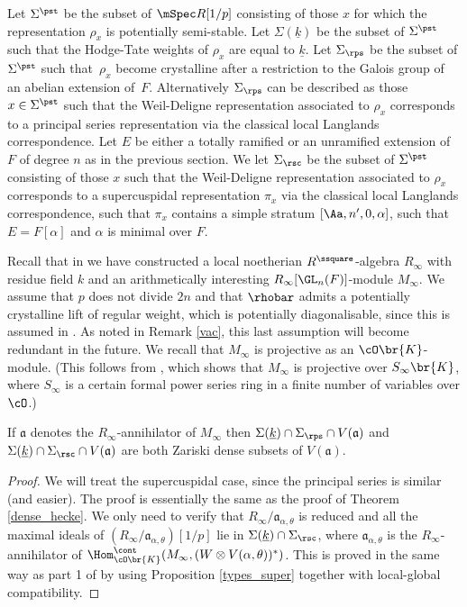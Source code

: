 Let $\Sigma^{\pst}$ be the subset of $\mSpec R[1/p]$ consisting of those
$x$ for which the representation $\rho_x$ is potentially semi-stable. Let $\Sigma(\underline{k})$ be the subset of $\Sigma^{\pst}$
such that the Hodge-Tate weights of $\rho_x$ are equal to $\underline{k}$. Let $\Sigma_{\rps}$ be the subset of $\Sigma^{\pst}$
such that~$\rho_x$ become crystalline after a restriction to the Galois group of an abelian extension of~$F$. Alternatively $\Sigma_{\rps}$ can be described
as those $x\in \Sigma^{\pst}$ such that the Weil-Deligne representation associated to $\rho_x$ corresponds to a principal series representation via the
classical local Langlands correspondence. Let $E$ be either a totally ramified or an unramified extension of $F$ of degree $n$ as in the previous section. We
let $\Sigma_{\rsc}$ be the subset of $\Sigma^{\pst}$ consisting of those $x$ such that the Weil-Deligne representation associated to $\rho_x$ corresponds to
a supercuspidal representation $\pi_x$ via the classical local Langlands correspondence, such that $\pi_x$ contains a simple stratum $[\Aa, n', 0, \alpha]$, such that $E=F[\alpha]$ and $\alpha$ is minimal over $F$.

Recall that in \cite{six-authors} we have constructed a local noetherian $R^\ssquare$-algebra $R_{\infty}$ with residue field $k$ and an arithmetically interesting $R_{\infty}[\GL_n(F)]$-module $M_{\infty}$. We assume that
$p$ does not divide $2n$ and that $\rhobar$ admits a potentially crystalline lift of regular weight, which is
potentially diagonalisable, since this is assumed in \cite{six-authors}. As noted in Remark \ref{vac}, this last assumption will become redundant in the future.
We recall that $M_{\infty}$ is projective as an $\cO\br{K}$-module.
(This follows from \cite[Prop.\,2.10]{six-authors}, which
shows that $M_{\infty}$ is projective over $S_{\infty}\br{K}$,
where $S_{\infty}$ is a certain formal power series ring in a finite
number of variables over $\cO$.)

\begin{thm}\label{capture_local} If $\mathfrak a$ denotes
the $R_{\infty}$-annihilator of $M_{\infty}$
then $\Sigma(\underline{k}) \cap \Sigma_{\rps}\cap V(\mathfrak a)$ and
$\Sigma(\underline{k}) \cap \Sigma_{\rsc}\cap V(\mathfrak a)$ are both Zariski dense
subsets of $V(\mathfrak a)$.
\end{thm}

\begin{proof} We will treat the supercuspidal case, since
the principal series is similar (and easier).
The proof is essentially the same as the proof of Theorem \ref{dense_hecke}. We only need to verify that $R_{\infty}/\mathfrak a_{\alpha, \theta}$ is reduced and all the maximal ideals of $(R_{\infty}/\mathfrak a_{\alpha, \theta})[1/p]$ lie in $\Sigma(\underline{k})\cap \Sigma_{\rsc}$, where
$\mathfrak a_{\alpha, \theta}$ is the $R_{\infty}$-annihilator of $\Hom_{\cO\br{K}}^{\cont}(M_\infty, (W\otimes V(\alpha, \theta))^*)$. This is proved in the same way as
part 1 of \cite[Lem.\,4.17]{six-authors} by using Proposition \ref{types_super} together with local-global compatibility.
\end{proof}


